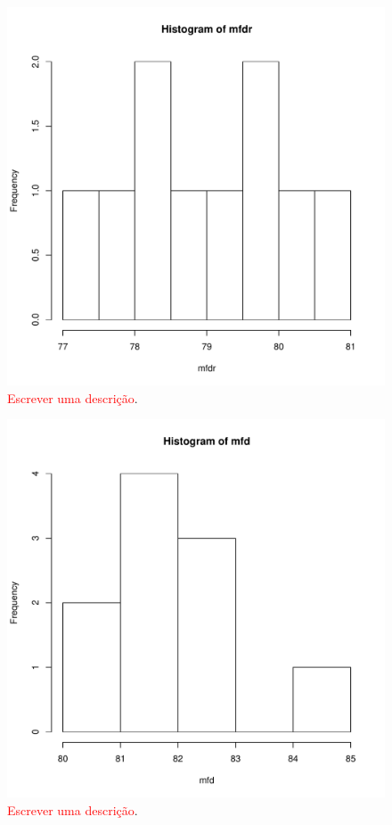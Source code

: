 \documentclass[conference]{IEEEtran}
\begin{document}
\begin{figure}[h]
	\centering
	\includegraphics[width=\linewidth]{img/hist_mfdr.pdf}
	\caption{\textcolor{red}{Escrever uma descrição}.}
	\label{fig:hist_mfdr}
\end{figure}

\begin{figure}[h]
	\centering
	\includegraphics[width=\linewidth]{img/hist_mfd.pdf}
	\caption{\textcolor{red}{Escrever uma descrição}.}
	\label{fig:hist_mfd}
\end{figure}
\end{document}
